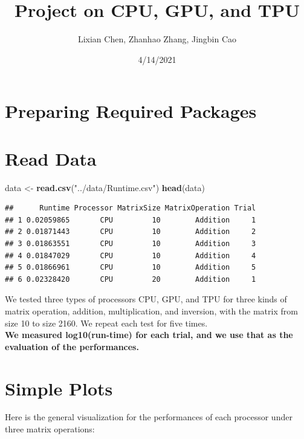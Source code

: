 \documentclass[
]{article}
\title{Project on CPU, GPU, and TPU}
\author{Lixian Chen, Zhanhao Zhang, Jingbin Cao}
\date{4/14/2021}
\newenvironment{Shaded}{\begin{snugshade}}{\end{snugshade}}
\newcommand{\KeywordTok}[1]{\textcolor[rgb]{0.13,0.29,0.53}{\textbf{#1}}}
\newcommand{\NormalTok}[1]{#1}
\newcommand{\StringTok}[1]{\textcolor[rgb]{0.31,0.60,0.02}{#1}}
\begin{document}
\maketitle

\hypertarget{preparing-required-packages}{%
\section{Preparing Required
Packages}\label{preparing-required-packages}}

\hypertarget{read-data}{%
\section{Read Data}\label{read-data}}

\begin{Shaded}
\begin{Highlighting}[]
\NormalTok{data \textless{}{-}}\StringTok{ }\KeywordTok{read.csv}\NormalTok{(}\StringTok{"../data/Runtime.csv"}\NormalTok{)}
\KeywordTok{head}\NormalTok{(data)}
\end{Highlighting}
\end{Shaded}

\begin{verbatim}
##      Runtime Processor MatrixSize MatrixOperation Trial
## 1 0.02059865       CPU         10        Addition     1
## 2 0.01871443       CPU         10        Addition     2
## 3 0.01863551       CPU         10        Addition     3
## 4 0.01847029       CPU         10        Addition     4
## 5 0.01866961       CPU         10        Addition     5
## 6 0.02328420       CPU         20        Addition     1
\end{verbatim}

We tested three types of processors CPU, GPU, and TPU for three kinds of
matrix operation, addition, multiplication, and inversion, with the
matrix from size 10 to size 2160. We repeat each test for five times.\\
\textbf{We measured log10(run-time) for each trial, and we use that as
the evaluation of the performances.}

\hypertarget{simple-plots}{%
\section{Simple Plots}\label{simple-plots}}

Here is the general visualization for the performances of each processor
under three matrix operations:
\end{document}
